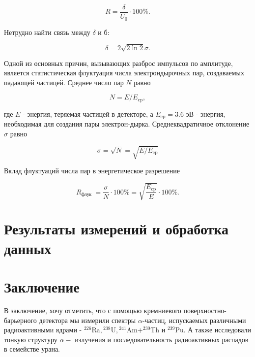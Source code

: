 \documentclass[a4paper, 12pt]{article}
\begin{document}
    $$
    R=\frac{\delta}{U_0} \cdot 100 \% .
    $$

    Нетрудно найти связь между $\delta$ и б:

    $$
    \delta=2 \sqrt{2 \ln 2} \sigma .
    $$

    Одной из основных причин, вызывающих разброс импульсов по амплитуде, является статистическая флуктуация числа электрондырочных пар, создаваемых падающей частицей. Среднее число пар $N$ равно

    $$
    N=E / E_{\mathrm{cp}},
    $$

    где $E$ - энергия, теряемая частицей в детекторе, а $E_{\mathrm{cp}}=3.6$ эВ - энергия, необходимая для создания пары электрон-дырка. Среднеквадратичное отклонение $\sigma$ равно

    $$
    \sigma=\sqrt{N}=\sqrt{E / E_{\mathrm{cp}}}
    $$

    Вклад флуктуаций числа пар в энергетическое разрешение

    $$
    R_{\text {флук }}=\frac{\sigma}{N} \cdot 100 \%=\sqrt{\frac{E_{\mathrm{cp}}}{E}} \cdot 100 \% .
    $$
    
    
\section{Результаты измерений и обработка данных} 

    
\section{Заключение}
    В заключение, хочу отметить, что с помощью кремниевого поверхностно-барьерного детектора мы измерили спектры $\alpha$-частиц, испускаемых различными радиоактивными ядрами - ${ }^{226} \mathrm{Ra},{ }^{238} \mathrm{U},{ }^{241} \mathrm{Am} + ^{230} \mathrm{Th}$ и ${ }^{239} \mathrm{Pu}$. 
    А также исследовали тонкую структуру $\alpha-$ излучения и последовательность радиоактивных распадов в семействе урана.
    
\end{document}
